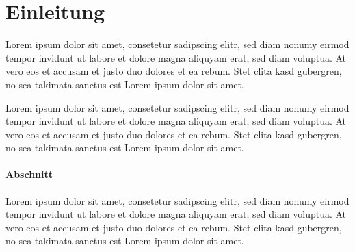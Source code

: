 \section{Einleitung}
\label{sec:einleitung}

Lorem ipsum dolor sit amet, consetetur sadipscing elitr, sed diam nonumy eirmod
tempor invidunt ut labore et dolore magna aliquyam erat, sed diam voluptua. At
vero eos et accusam et justo duo dolores et ea rebum. Stet clita kasd gubergren,
no sea takimata sanctus est Lorem ipsum dolor sit amet.

Lorem ipsum dolor sit amet, consetetur sadipscing elitr, sed diam nonumy eirmod
tempor invidunt ut labore et dolore magna aliquyam erat, sed diam voluptua. At
vero eos et accusam et justo duo dolores et ea rebum. Stet clita kasd gubergren,
no sea takimata sanctus est Lorem ipsum dolor sit amet.

\paragraph{Abschnitt}
Lorem ipsum dolor sit amet, consetetur sadipscing elitr, sed diam nonumy eirmod
tempor invidunt ut labore et dolore magna aliquyam erat, sed diam voluptua. At
vero eos et accusam et justo duo dolores et ea rebum. Stet clita kasd gubergren,
no sea takimata sanctus est Lorem ipsum dolor sit amet.